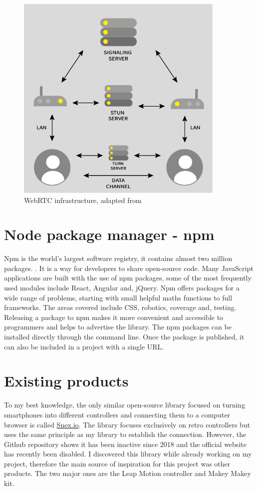 \documentclass{l4proj}
\begin{document}
\begin{figure}[h!]
    \centering
    \includegraphics[width=10cm]{./images/webrtc.png}
    \caption{WebRTC infrastructure, adapted from \cite{server}}
    \label{fig:webrtc}
\end{figure}

\section{Node package manager - npm}
Npm is the world's largest software registry, it contains almost two million packages. \cite{npm}. It is a way for developers to share open-source code. Many JavaScript applications are built with the use of npm packages, some of the most frequently used modules include React, Angular and, jQuery. Npm offers packages for a wide range of problems, starting with small helpful maths functions to full frameworks. The areas covered include CSS, robotics, coverage and, testing. Releasing a package to npm makes it more convenient and accessible to programmers and helps to advertise the library. The npm packages can be installed directly through the command line. Once the package is published, it can also be included in a project with a single URL.

\section{Existing products}
To my best knowledge, the only similar open-source library focused on turning smartphones into different controllers and connecting them to a computer browser is called \href{https://github.com/snex-io/snex-lib}{Snex.io}. The library focuses exclusively on retro controllers but uses the same principle as my library to establish the connection. However, the Github repository shows it has been inactive since 2018 and the official website has recently been disabled. I discovered this library while already working on my project, therefore the main source of inspiration for this project was other products. The two major ones are the Leap Motion controller and Makey Makey kit. 
\end{document}
